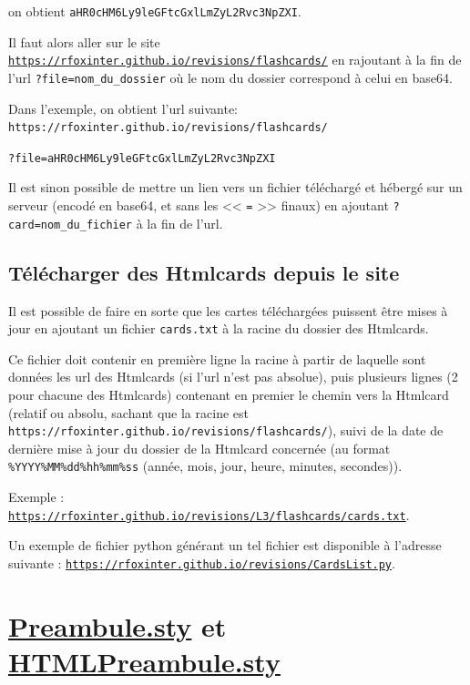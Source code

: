 \documentclass[a4paper,12pt]{article}
\let\oldsection\section
\newcommand{\ssection}[2][]{\clearpage\oldsection[#1]{#2}}
\begin{document}
on obtient \texttt{aHR0cHM6Ly9leGFtcGxlLmZyL2Rvc3NpZXI}.

Il faut alors aller sur le site \href{https://rfoxinter.github.io/revisions/flashcards/}{\texttt{https://rfoxinter.github.io/revisions/flashcards/}} en rajoutant à la fin de l'url \texttt{?file=nom\_du\_dossier} où le nom du dossier correspond à celui en base64.

Dans l'exemple, on obtient l'url suivante:\\\texttt{https://rfoxinter.github.io/revisions/flashcards/}

\hfill\texttt{?file=aHR0cHM6Ly9leGFtcGxlLmZyL2Rvc3NpZXI}

Il est sinon possible de mettre un lien vers un fichier téléchargé et hébergé sur un serveur (encodé en base64, et sans les << \texttt{=} >> finaux) en ajoutant \texttt{?card=nom\_du\_fichier} à la fin de l'url.
\subsection{Télécharger des Htmlcards depuis le site}
Il est possible de faire en sorte que les cartes téléchargées puissent être mises à jour en ajoutant un fichier \texttt{cards.txt} à la racine du dossier des Htmlcards.

Ce fichier doit contenir en première ligne la racine à partir de laquelle sont données les url des Htmlcards (si l'url n'est pas absolue), puis plusieurs lignes (2 pour chacune des Htmlcards) contenant en premier le chemin vers la Htmlcard (relatif ou absolu, sachant que la racine est \texttt{https://rfoxinter.github.io/revisions/flashcards/}), suivi de la date de dernière mise à jour du dossier de la Htmlcard concernée (au format \texttt{\%YYYY\%MM\%dd\%hh\%mm\%ss} (année, mois, jour, heure, minutes, secondes)).

Exemple : \href{https://rfoxinter.github.io/revisions/L3/flashcards/cards.txt}{\texttt{https://rfoxinter.github.io/revisions/L3/flashcards/cards.txt}}.

Un exemple de fichier python générant un tel fichier est disponible à l'adresse suivante : \href{https://rfoxinter.github.io/revisions/CardsList.py}{\texttt{https://rfoxinter.github.io/revisions/CardsList.py}}.
\ssection[Preambule.sty et HTMLPreambule.sty]{\href{https://rfoxinter.github.io/revisions/output/Preambule.sty}{\color{black}Preambule.sty} et \href{https://rfoxinter.github.io/revisions/output/HTMLPreambule.sty}{\color{black}HTMLPreambule.sty}}
\end{document}

